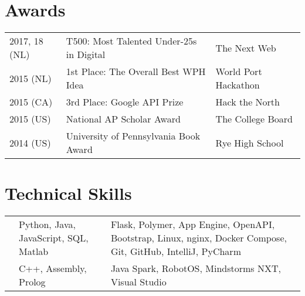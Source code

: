 \documentclass[]{deedy-resume-openfont}
\begin{document}
\begin{minipage}[t]{0.66\textwidth}
\section{Awards} 
\begin{tabular}{lll}
2017, 18 (NL)   & T500: Most Talented Under-25s in Digital  & The Next Web\\
2015 (NL)   & 1st Place: The Overall Best WPH Idea      & World Port Hackathon\\
2015 (CA)   & 3rd Place: Google API Prize               & Hack the North\\
2015 (US)   & National AP Scholar Award                 & The College Board\\
2014 (US)   & University of Pennsylvania Book Award     & Rye High School\\
\end{tabular}
\vspace{0.1\topsep}


\section{Technical Skills}
\vspace{-\topsep}
\settowidth{}
\begin{tabulary}{\linewidth}{LLL}
    &  &  \\
    \hline
     & Python, Java, JavaScript, SQL, Matlab & Flask, Polymer, App Engine, OpenAPI, Bootstrap, Linux, nginx, Docker Compose, Git, GitHub, IntelliJ, PyCharm \\
    \hline
     & C++, Assembly, Prolog & Java Spark, RobotOS, Mindstorms NXT, Visual Studio
\end{tabulary} 

\end{minipage} 
\end{document}
